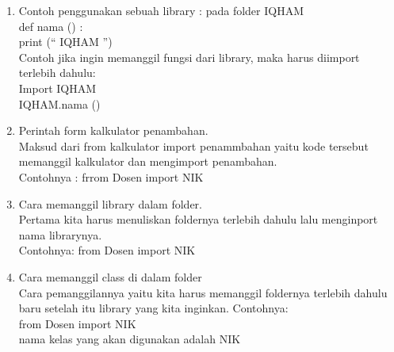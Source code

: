 \begin{enumerate}
	\item Contoh penggunakan sebuah library : pada folder IQHAM\\
	def  nama () :\\
	print (“ IQHAM ”)\\
	Contoh jika ingin memanggil fungsi dari library, maka harus diimport terlebih dahulu:\\
	Import IQHAM\\
	IQHAM.nama ()\\
	
	\item Perintah form kalkulator penambahan.\\
	Maksud dari from kalkulator import penammbahan yaitu kode tersebut memanggil kalkulator dan mengimport penambahan.\\
	Contohnya : frrom Dosen import NIK\\
	
	\item Cara memanggil library dalam folder.\\
	Pertama kita harus menuliskan foldernya terlebih dahulu lalu menginport nama librarynya.\\
    Contohnya: from Dosen import NIK\\ 
	
	\item Cara memanggil class di dalam folder\\
	Cara pemanggilannya yaitu kita harus memanggil foldernya terlebih dahulu baru setelah itu library yang kita inginkan. Contohnya:\\
	from Dosen import NIK\\
	nama kelas yang akan digunakan adalah NIK\\
	


\end{enumerate}
